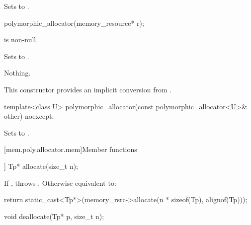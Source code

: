 \begin{itemdescr}
\pnum
\effects
Sets  to .
\end{itemdescr}

%
\begin{itemdecl}
polymorphic_allocator(memory_resource* r);
\end{itemdecl}

\begin{itemdescr}
\pnum
\expects
{} is non-null.

\pnum
\effects
Sets  to .

\pnum
\throws
Nothing.

\pnum
\begin{note}
This constructor provides an implicit conversion from .
\end{note}
\end{itemdescr}

%
\begin{itemdecl}
template<class U> polymorphic_allocator(const polymorphic_allocator<U>& other) noexcept;
\end{itemdecl}

\begin{itemdescr}
\pnum
\effects
Sets  to .
\end{itemdescr}


[mem.poly.allocator.mem]{Member functions}

%
\begin{itemdecl}
[[nodiscard]] Tp* allocate(size_t n);
\end{itemdecl}

\begin{itemdescr}
\pnum
\effects
If ,
throws .
Otherwise equivalent to:
\begin{codeblock}
return static_cast<Tp*>(memory_rsrc->allocate(n * sizeof(Tp), alignof(Tp)));
\end{codeblock}
\end{itemdescr}

%
\begin{itemdecl}
void deallocate(Tp* p, size_t n);
\end{itemdecl}

